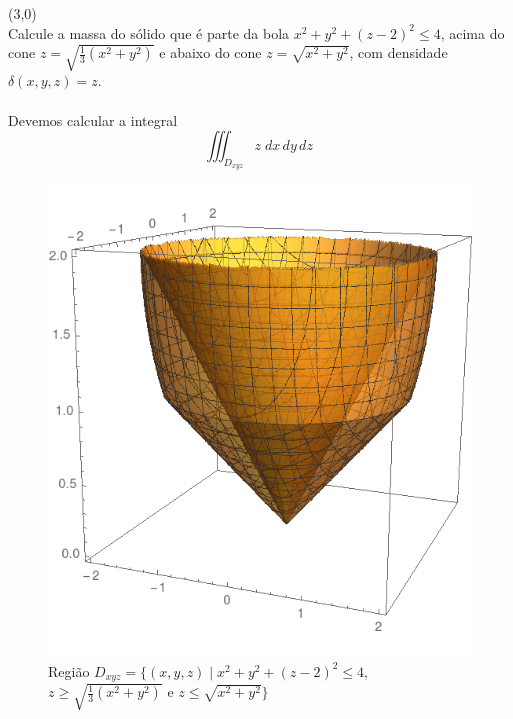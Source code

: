 \documentclass[12pt,a4paper]{article}
\begin{document}
\newpage

 (3,0) \\

Calcule a massa do sólido que é parte da bola $ x^2 + y^2 + (z-2)^2 \leq 4 $, acima do cone $ z = \displaystyle\sqrt{\frac{1}{3}(x^2 + y^2)}$ e abaixo do cone $z = \sqrt{x^2 + y^2}$, com densidade $\delta(x,y,z) = z$. \\

\\

Devemos calcular a integral
\begin{equation}
 \iiint_{D_{xyz}} z \;dx\,dy\,dz \
\label{eq:integral}
\end{equation}

\begin{figure}[H]
	\centering
	\includegraphics[scale=0.3]{Fig3A.png}  
	\caption{Regi\~{a}o $ D_{xyz} = \lbrace(x, y, z)\mid x^2 + y^2 + (z-2)^2 \leq 4 $, $z \geq \sqrt{\frac{1}{3}(x^2 + y^2)} $ e $ z \leq \sqrt{x^2 + y^2} \rbrace $}
	\label{fig:figura3}
\end{figure}
\end{document}

